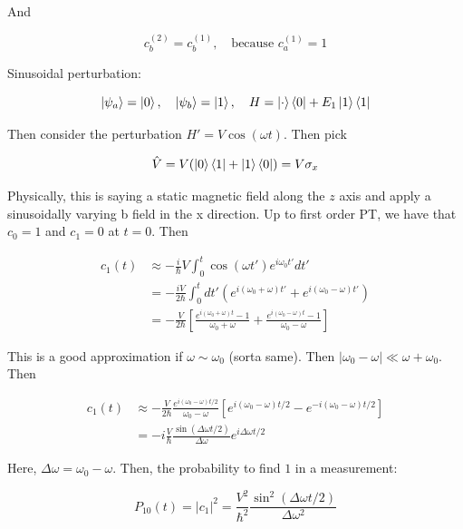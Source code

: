 \documentclass{article}
\newtheorem{one minute paper}[theorem]{One Minute Paper}
\begin{document}
And 

\begin{equation}
    c_b^{(2)} = c_b^{(1)}, \quad \text{because $c_a^{(1)} =1$}
\end{equation}

Sinusoidal perturbation: 

\begin{equation}
    \ket{\psi_a} = \ket{0}, \quad \ket{\psi_b} = \ket{1}, \quad H = \ket{\cdot}\bra{0} + E_1 \ket{1}\bra{1}
\end{equation}

Then consider the perturbation $H' = V \cos(\omega t)$. Then pick 

\begin{equation}
    \hat{V} = V(\ket{0}\bra{1} + \ket{1}\bra{0}) = V\sigma_x
\end{equation}

Physically, this is saying a static magnetic field along the $z$ axis and apply a sinusoidally varying b field in the x direction. Up to first order PT, we have that $c_0 =1$ and $c_1 =0$ at $t=0$. Then 

\begin{align*}
    c_1(t) &\approx -\frac{i}{\hbar}V\int_{0}^{t}\cos(\omega t')e^{i\omega_0 t'}dt' \\
    &= -\frac{iV}{2\hbar}\int_{0}^{t}dt'\left( e^{i(\omega_0 + \omega)t'} + e^{i(\omega_0 - \omega)t'} \right) \\
    &= -\frac{V}{2\hbar}\left[ \frac{e^{i(\omega_0 + \omega)t} - 1}{\omega_0 + \omega} + \frac{e^{i(\omega_0 - \omega)t} - 1}{\omega_0 - \omega} \right]
\end{align*}

This is a good approximation if $\omega \sim \omega_0$ (sorta same). Then $|\omega_0 - \omega| \ll \omega + \omega_0$. Then 

\begin{align*}
    c_1(t) &\approx -\frac{V}{2\hbar}\frac{e^{i(\omega_0 - \omega)t/2}}{\omega_0 - \omega}\left[ e^{i(\omega_0 - \omega)t/2} - e^{-i(\omega_0 - \omega)t/2}  \right] \\
    &= -i\frac{V}{\hbar}\frac{\sin(\Delta \omega t/2)}{\Delta \omega}e^{i\Delta \omega t/2}
\end{align*}

Here, $\Delta \omega = \omega_0 - \omega$. Then, the probability to find $1$ in a measurement: 

\begin{equation}
    P_{10}(t) = |c_1|^2  = \frac{V^2}{\hbar^2}\frac{\sin^2(\Delta \omega t/2)}{\Delta\omega^2}
\end{equation}
\end{document}
